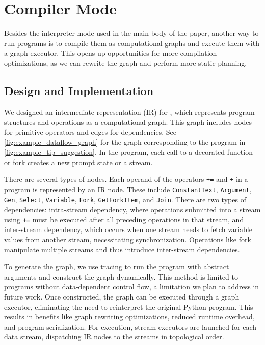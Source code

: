 \section{Compiler Mode}
\label{sec:compiler_mode}
Besides the interpreter mode used in the main body of the paper, another way to run \lang programs is to compile them as computational graphs and execute them with a graph executor. This opens up opportunities for more compilation optimizations, as we can rewrite the graph and perform more static planning.

\subsection{Design and Implementation}

We designed an intermediate representation (IR) for \lang, which represents \lang program structures and operations as a computational graph. This graph includes nodes for primitive operators and edges for dependencies. See \autoref{fig:example_dataflow_graph} for the graph corresponding to the program in \autoref{fig:example_tip_suggestion}. In the program, each call to a decorated function or fork creates a new prompt state or a stream.

There are several types of nodes. Each operand of the operators \texttt{+=} and \texttt{+} in a \lang program is represented by an IR node. These include \texttt{ConstantText}, \texttt{Argument}, \texttt{Gen}, \texttt{Select}, \texttt{Variable}, \texttt{Fork}, \texttt{GetForkItem}, and \texttt{Join}. There are two types of dependencies: intra-stream dependency, where operations submitted into a stream using \texttt{+=} must be executed after all preceding operations in that stream, and inter-stream dependency, which occurs when one stream needs to fetch variable values from another stream, necessitating synchronization. Operations like fork manipulate multiple streams and thus introduce inter-stream dependencies.

To generate the graph, we use tracing to run the program with abstract arguments and construct the graph dynamically. This method is limited to programs without data-dependent control flow, a limitation we plan to address in future work. Once constructed, the graph can be executed through a graph executor, eliminating the need to reinterpret the original Python program. This results in benefits like graph rewriting optimizations, reduced runtime overhead, and program serialization. For execution, stream executors are launched for each data stream, dispatching IR nodes to the streams in topological order.


